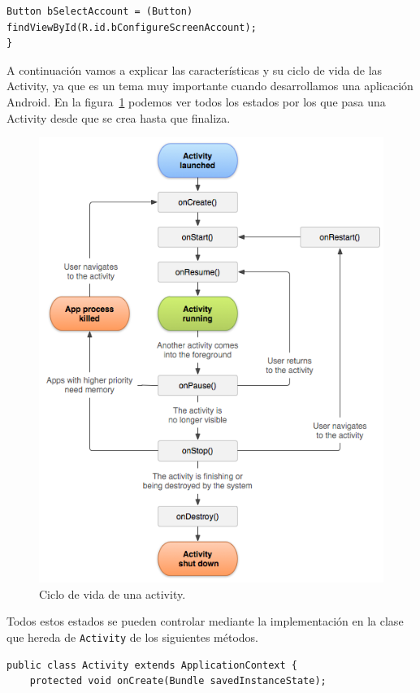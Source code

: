 \begin{itemize}
\begin{lstlisting}[style=Java]
	Button bSelectAccount = (Button) findViewById(R.id.bConfigureScreenAccount);
}
\end{lstlisting}

A continuación vamos a explicar las características y su ciclo de vida de las Activity, ya que es un tema muy importante cuando desarrollamos una aplicación Android. En la figura~\ref{fig:cicloActivity} podemos ver todos los estados por los que pasa una Activity desde que se crea hasta que finaliza. 

\begin{figure}
  \centering
    \includegraphics[scale=0.8]{./Android/imagenes/cicloActivity.png}
  \caption{Ciclo de vida de una activity.}
  \label{fig:cicloActivity}
\end{figure}

Todos estos estados se pueden controlar mediante la implementación en la clase que hereda de \lstinline{Activity} de los siguientes métodos.

\begin{lstlisting}[style=Java]
public class Activity extends ApplicationContext {
	protected void onCreate(Bundle savedInstanceState);


\end{lstlisting}
\end{itemize}
